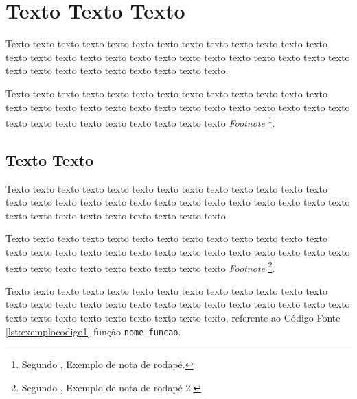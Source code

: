 \chapter{Texto Texto Texto}
\label{chap:metodologia}

Texto texto texto texto texto texto texto texto texto texto texto texto texto texto texto texto texto texto texto texto texto texto texto texto texto texto texto texto texto texto texto texto texto texto texto texto.

Texto texto texto texto texto texto texto texto texto texto texto texto texto texto texto texto texto texto texto texto texto texto texto texto texto texto texto texto texto texto texto texto texto texto texto texto \textit{Footnote} \footnote{Segundo , Exemplo de nota de rodapé.}.

\section{Texto Texto}
\label{sec:algumlabel}

Texto texto texto texto texto texto texto texto texto texto texto texto texto texto texto texto texto texto texto texto texto texto texto texto texto texto texto texto texto texto texto texto texto texto texto texto.

Texto texto texto texto texto texto texto texto texto texto texto texto texto texto texto texto texto texto texto texto texto texto texto texto texto texto texto texto texto texto texto texto texto texto texto texto \textit{Footnote} \footnote{Segundo , Exemplo de nota de rodapé 2.}.



\hspace{4cm}
\hfill
\begin{minipage}[t]{.65\textwidth}
\fonteautor
\end{minipage}


Texto texto texto texto texto texto texto texto texto texto texto texto texto texto texto texto texto texto texto texto texto texto texto texto texto texto texto texto texto texto texto texto texto texto texto texto, referente ao Código Fonte \ref{lst:exemplocodigo1} função \texttt{nome\_funcao}.

